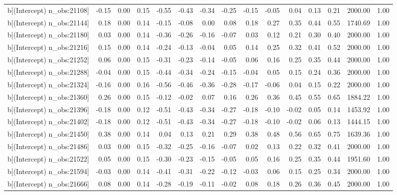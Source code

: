 \begin{table}[ht]
\begin{tabular}{rrrrrrrrrrrrrrr}
  b[(Intercept) n\_obs:21108] & -0.15 & 0.00 & 0.15 & -0.55 & -0.43 & -0.34 & -0.25 & -0.15 & -0.05 & 0.04 & 0.13 & 0.21 & 2000.00 & 1.00 \\ 
  b[(Intercept) n\_obs:21144] & 0.18 & 0.00 & 0.14 & -0.15 & -0.08 & 0.00 & 0.08 & 0.18 & 0.27 & 0.35 & 0.44 & 0.55 & 1740.69 & 1.00 \\ 
  b[(Intercept) n\_obs:21180] & 0.03 & 0.00 & 0.14 & -0.36 & -0.26 & -0.16 & -0.07 & 0.03 & 0.12 & 0.21 & 0.30 & 0.40 & 2000.00 & 1.00 \\ 
  b[(Intercept) n\_obs:21216] & 0.15 & 0.00 & 0.14 & -0.24 & -0.13 & -0.04 & 0.05 & 0.14 & 0.25 & 0.32 & 0.41 & 0.52 & 2000.00 & 1.00 \\ 
  b[(Intercept) n\_obs:21252] & 0.06 & 0.00 & 0.15 & -0.31 & -0.23 & -0.14 & -0.05 & 0.06 & 0.16 & 0.25 & 0.35 & 0.44 & 2000.00 & 1.00 \\ 
  b[(Intercept) n\_obs:21288] & -0.04 & 0.00 & 0.15 & -0.44 & -0.34 & -0.24 & -0.15 & -0.04 & 0.05 & 0.15 & 0.24 & 0.36 & 2000.00 & 1.00 \\ 
  b[(Intercept) n\_obs:21324] & -0.16 & 0.00 & 0.16 & -0.56 & -0.46 & -0.36 & -0.28 & -0.17 & -0.06 & 0.04 & 0.15 & 0.22 & 2000.00 & 1.00 \\ 
  b[(Intercept) n\_obs:21360] & 0.26 & 0.00 & 0.15 & -0.12 & -0.02 & 0.07 & 0.16 & 0.26 & 0.36 & 0.45 & 0.55 & 0.65 & 1884.22 & 1.00 \\ 
  b[(Intercept) n\_obs:21396] & -0.18 & 0.00 & 0.12 & -0.51 & -0.43 & -0.34 & -0.27 & -0.18 & -0.10 & -0.02 & 0.05 & 0.14 & 1453.92 & 1.00 \\ 
  b[(Intercept) n\_obs:21402] & -0.18 & 0.00 & 0.12 & -0.51 & -0.43 & -0.34 & -0.27 & -0.18 & -0.10 & -0.02 & 0.06 & 0.13 & 1444.15 & 1.00 \\ 
  b[(Intercept) n\_obs:21450] & 0.38 & 0.00 & 0.14 & 0.04 & 0.13 & 0.21 & 0.29 & 0.38 & 0.48 & 0.56 & 0.65 & 0.75 & 1639.36 & 1.00 \\ 
  b[(Intercept) n\_obs:21486] & 0.03 & 0.00 & 0.15 & -0.32 & -0.25 & -0.16 & -0.07 & 0.02 & 0.13 & 0.22 & 0.32 & 0.41 & 2000.00 & 1.00 \\ 
  b[(Intercept) n\_obs:21522] & 0.05 & 0.00 & 0.15 & -0.30 & -0.23 & -0.15 & -0.05 & 0.05 & 0.16 & 0.25 & 0.35 & 0.44 & 1951.60 & 1.00 \\ 
  b[(Intercept) n\_obs:21594] & -0.03 & 0.00 & 0.14 & -0.41 & -0.31 & -0.22 & -0.12 & -0.03 & 0.06 & 0.15 & 0.25 & 0.34 & 2000.00 & 1.00 \\ 
  b[(Intercept) n\_obs:21666] & 0.08 & 0.00 & 0.14 & -0.28 & -0.19 & -0.11 & -0.02 & 0.08 & 0.18 & 0.26 & 0.36 & 0.45 & 2000.00 & 1.00 \\ 

\end{tabular}
\end{table}
